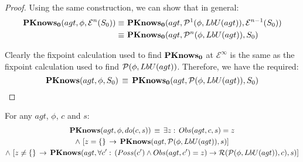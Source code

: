 \begin{proof}
Using the same construction, we can show that in general:\begin{align*}
\mathbf{PKnows_{0}}(agt,\phi,\mathcal{E}^{n}(S_{0}))\equiv\,\, & \mathbf{PKnows_{0}}(agt,\mathcal{P}^{1}(\phi,LbU(agt)),\mathcal{E}^{n-1}(S_{0}))\\
\equiv\,\, & \mathbf{PKnows_{0}}(agt,\mathcal{P}^{n}(\phi,LbU(agt)),S_{0})\end{align*}


Clearly the fixpoint calculation used to find $\mathbf{PKnows_{0}}$ at $\mathcal{E}^{\infty}$
is the same as the fixpoint calculation used to find $\mathcal{P}(\phi,LbU(agt))$.
Therefore, we have the required:\[
\mathbf{PKnows}(agt,\phi,S_{0})\,\equiv\,\mathbf{PKnows_{0}}(agt,\mathcal{P}(\phi,LbU(agt)),S_{0})\]

\end{proof}
\medskip{}


\begin{lemmaext}
[{{[}{{[}{\ref{lem:Pknows_LbU_do}}]}]}] For any $agt$, $\phi$,
$c$ and $s$:\begin{multline*}
\mathbf{PKnows}(agt,\phi,do(c,s))\,\equiv\,\exists z:\, Obs(agt,c,s)=z\\
\wedge\,\left[z=\{\}\,\rightarrow\,\mathbf{PKnows}(agt,\mathcal{P}(\phi,LbU(agt)),s)\right]\\
\wedge\,\left[z\neq\{\}\,\rightarrow\,\mathbf{PKnows}(agt,\forall c':\,\left(Poss(c')\wedge Obs(agt,c')=z\right)\rightarrow\mathcal{R}(\mathcal{P}(\phi,LbU(agt)),c),s)\right]\end{multline*}

\end{lemmaext}
